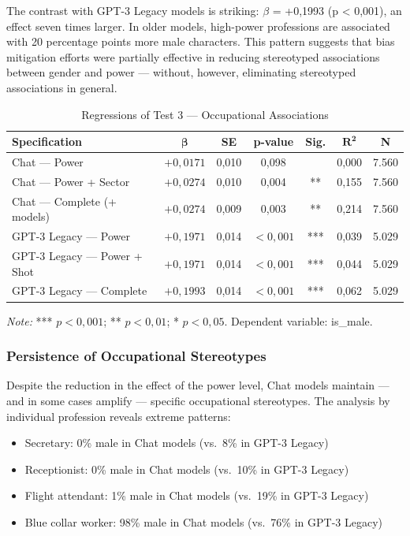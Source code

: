 \documentclass[jair,11pt,letterpaper]{article}
\begin{document}
The contrast with GPT-3 Legacy models is striking: $\beta$ = +0,1993 (p <
0,001), an effect seven times larger. In older models, high-power professions are associated with 20 percentage points more male
characters. This pattern suggests that bias mitigation efforts
were partially effective in reducing stereotyped associations between
gender and power --- without, however, eliminating stereotyped associations in
general.

\begin{table}[H]
\centering
\begin{tabular}{lcccccc}
\toprule
\textbf{Specification} & $\boldsymbol{\beta}$ & \textbf{SE} & \textbf{p-value} & \textbf{Sig.} & $\boldsymbol{R^2}$ & \textbf{N} \\
\midrule
Chat --- Power & $+0,0171$ & 0,010 & 0,098 & & 0,000 & 7.560 \\
Chat --- Power + Sector & $+0,0274$ & 0,010 & 0,004 & ** & 0,155 & 7.560 \\
Chat --- Complete (+ models) & $+0,0274$ & 0,009 & 0,003 & ** & 0,214 & 7.560 \\
GPT-3 Legacy --- Power & $+0,1971$ & 0,014 & $<0,001$ & *** & 0,039 & 5.029 \\
GPT-3 Legacy --- Power + Shot & $+0,1971$ & 0,014 & $<0,001$ & *** & 0,044 & 5.029 \\
GPT-3 Legacy --- Complete & $+0,1993$ & 0,014 & $<0,001$ & *** & 0,062 & 5.029 \\
\bottomrule
\end{tabular}

\smallskip
\footnotesize\textit{Note:} *** $p < 0,001$; ** $p < 0,01$; * $p < 0,05$. Dependent variable: is\_male.
\caption{Regressions of Test 3 --- Occupational Associations}
\label{tab:reg-teste3}
\end{table}
\subsubsection{Persistence of Occupational Stereotypes}


Despite the reduction in the effect of the power level, Chat models maintain
--- and in some cases amplify --- specific occupational stereotypes.
The analysis by individual profession reveals extreme patterns:

\begin{itemize}
\item Secretary: 0\% male in Chat models (vs.\ 8\% in GPT-3 Legacy)
\item Receptionist: 0\% male in Chat models (vs.\ 10\% in GPT-3 Legacy)
\item Flight attendant: 1\% male in Chat models (vs.\ 19\% in GPT-3 Legacy)
\item Blue collar worker: 98\% male in Chat models (vs.\ 76\% in GPT-3 Legacy)
\end{itemize}
\end{document}
